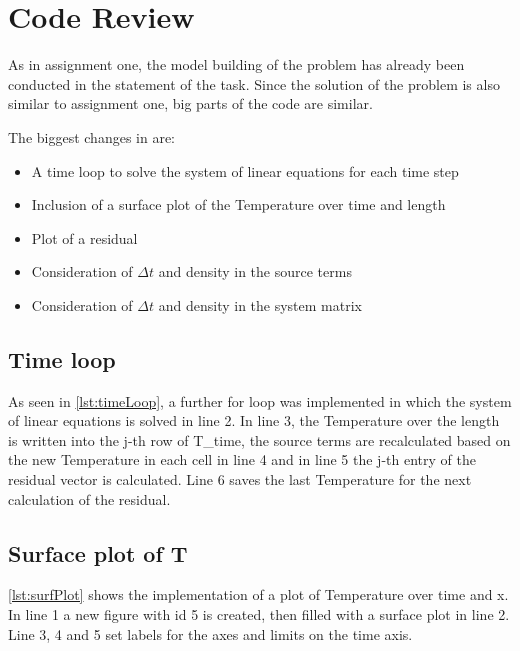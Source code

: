 \chapter{Code Review}
As in assignment one, the model building of the problem has already been conducted in the statement of the task. Since the solution of the problem is also similar to assignment one, big parts of the code are similar.

The biggest changes in are:

\begin{itemize}
\item A time loop to solve the system of linear equations for each time step
\item Inclusion of a surface plot of the Temperature over time and length
\item Plot of a residual
\item Consideration of $\Delta t$ and density in the source terms
\item Consideration of $\Delta t$ and density in the system matrix
\end{itemize}


\section{Time loop}


As seen in \autoref{lst:timeLoop}, a further for loop was implemented in which the system of linear equations is solved in line 2. In line 3, the Temperature over the length is written into the j-th row of T\_time, the source terms are recalculated based on the new Temperature in each cell in line 4 and in line 5 the j-th entry of the residual vector is calculated. Line 6 saves the last Temperature for the next calculation of the residual.


%
\section{Surface plot of T}


\autoref{lst:surfPlot} shows the implementation of a plot of Temperature over time and x. In line 1 a new figure with id 5 is created, then filled with a surface plot in line 2. Line 3, 4  and 5 set labels for the axes and limits on the time axis.

